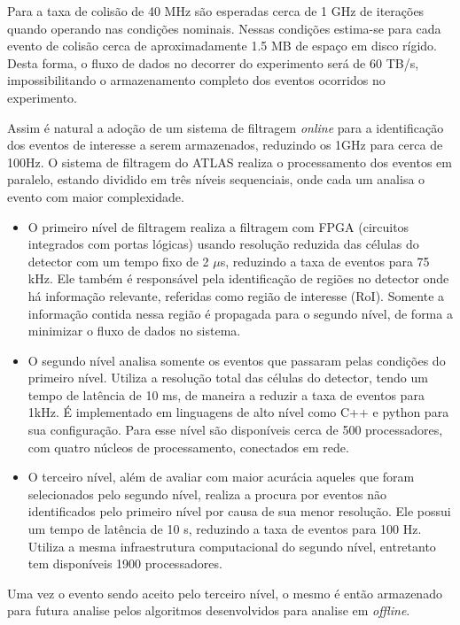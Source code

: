 Para a taxa de colisão de 40 MHz são esperadas cerca de 1 GHz de iterações quando
operando nas condições nominais. Nessas condições estima-se para cada evento de colisão 
cerca de aproximadamente 1.5 MB de espaço em disco rígido. Desta forma, 
o fluxo de dados no decorrer do experimento será de 60 TB/s, impossibilitando o
armazenamento completo dos eventos ocorridos no experimento. 

Assim é natural a adoção de um sistema de filtragem {\it online} para a
identificação dos eventos de interesse a serem armazenados, reduzindo os 1GHz
para cerca de 100Hz. O sistema de filtragem do ATLAS realiza o processamento dos 
eventos em paralelo, estando dividido em três níveis sequenciais, onde cada um 
analisa o evento com maior complexidade.

\begin{itemize}
\item O primeiro nível de filtragem realiza a filtragem com FPGA (circuitos
integrados com portas lógicas) usando resolução reduzida das células do detector
com um tempo fixo de 2 $\mu$s, reduzindo a taxa de eventos para
75 kHz. Ele também é responsável pela identificação de regiões no detector onde
há informação relevante, referidas como região de interesse (RoI). Somente a
informação contida nessa região é propagada para o segundo nível, de forma a
minimizar o fluxo de dados no sistema.
\item O segundo nível analisa somente os eventos que passaram pelas condições do
primeiro nível. Utiliza a resolução total das células do detector, 
tendo um tempo de latência de 10 ms, de maneira a reduzir a taxa de eventos para
1kHz. É implementado em linguagens de alto nível como C++ e python para sua configuração. 
Para esse nível são disponíveis cerca de 500 processadores, com quatro
núcleos de processamento, conectados em rede.
\item O terceiro nível, além de avaliar com maior acurácia aqueles que foram
selecionados pelo segundo nível, realiza a procura por eventos não identificados pelo
primeiro nível por causa de sua menor resolução. Ele possui um tempo de 
latência de 10 s, reduzindo a taxa de eventos para 100 Hz. Utiliza a mesma
infraestrutura computacional do segundo nível, entretanto tem disponíveis 1900 processadores.
\end{itemize}

Uma vez o evento sendo aceito pelo terceiro nível, o mesmo é então armazenado
para futura analise pelos algoritmos desenvolvidos para analise em {\it
offline}.

